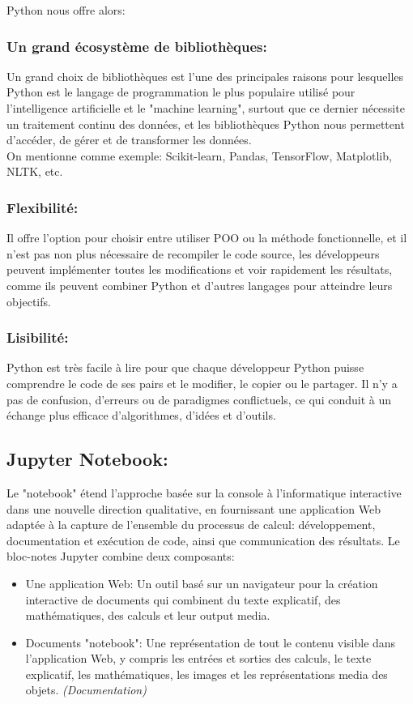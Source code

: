 Python nous offre alors:
\subsubsection{Un grand écosystème de bibliothèques:}
Un grand choix de bibliothèques est l'une des principales raisons pour lesquelles Python est le langage de programmation le plus populaire utilisé pour l'intelligence artificielle et le "machine learning", surtout que ce dernier nécessite un traitement continu des données, et les bibliothèques Python nous permettent d'accéder, de gérer et de transformer les données.\\

On mentionne comme exemple: Scikit-learn, Pandas, TensorFlow, Matplotlib, NLTK, etc.
\subsubsection{Flexibilité:}
Il offre l'option pour choisir entre utiliser POO ou la méthode fonctionnelle, et il n'est pas non plus nécessaire de recompiler le code source, les développeurs peuvent implémenter toutes les modifications et voir rapidement les résultats, comme ils peuvent combiner Python et d'autres langages pour atteindre leurs objectifs.
\subsubsection{Lisibilité:}
Python est très facile à lire pour que chaque développeur Python puisse comprendre le code de ses pairs et le modifier, le copier ou le partager. Il n'y a pas de confusion, d'erreurs ou de paradigmes conflictuels, ce qui conduit à un échange plus efficace d'algorithmes, d'idées et d'outils.
\subsection{Jupyter Notebook:}
Le "notebook" étend l'approche basée sur la console à l'informatique interactive dans une nouvelle direction qualitative, en fournissant une application Web adaptée à la capture de l'ensemble du processus de calcul: développement, documentation et exécution de code, ainsi que communication des résultats. Le bloc-notes Jupyter combine deux composants:
\begin{itemize}
    \item \textcolor{DispositionColor}{Une application Web:} Un outil basé sur un navigateur pour la création interactive de documents qui combinent du texte explicatif, des mathématiques, des calculs et leur output media.
    \item \textcolor{DispositionColor}{Documents "notebook":} Une représentation de tout le contenu visible dans l'application Web, y compris les entrées et sorties des calculs, le texte explicatif, les mathématiques, les images et les représentations media des objets. \textit{(Documentation)}
\end{itemize}
